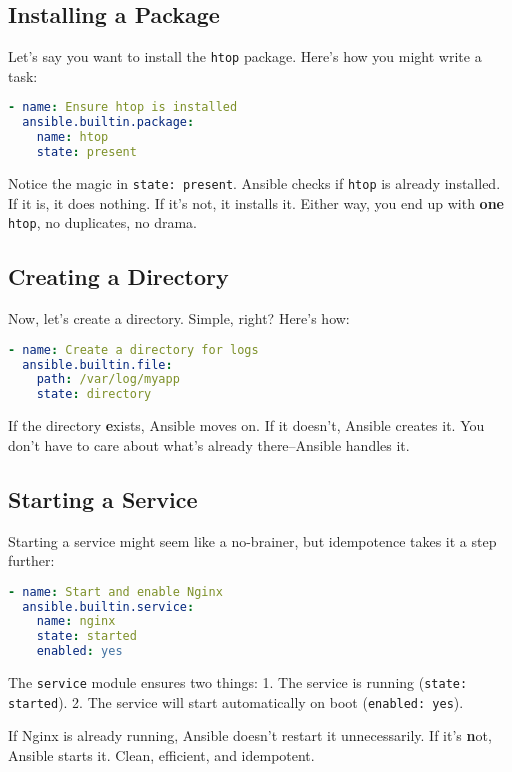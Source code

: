 \subsection{Installing a Package}

Let's say you want to install the \texttt{htop} package. Here's how you might write a task:
\begin{lstlisting}[language=yaml, caption=Installing a Package]
- name: Ensure htop is installed
  ansible.builtin.package:
    name: htop
    state: present
\end{lstlisting}

Notice the magic in \texttt{state: present}. Ansible checks if \texttt{htop} is already installed. If it is, it does nothing. If it's not, it installs it. Either way, you end up with \textbf{one} \texttt{htop}, no duplicates, no drama.

\subsection{Creating a Directory}

Now, let's create a directory. Simple, right? Here's how:
\begin{lstlisting}[language=yaml, caption=Creating a Directory]
- name: Create a directory for logs
  ansible.builtin.file:
    path: /var/log/myapp
    state: directory
\end{lstlisting}

If the directory \textbf{e}xists, Ansible moves on. If it doesn't, Ansible creates it. You don't have to care about what's already there--Ansible handles it.

\subsection{Starting a Service}

Starting a service might seem like a no-brainer, but idempotence takes it a step further:
\begin{lstlisting}[language=yaml, caption=Starting a Service]
- name: Start and enable Nginx
  ansible.builtin.service:
    name: nginx
    state: started
    enabled: yes
\end{lstlisting}

The \texttt{service} module ensures two things:
1. The service is running (\texttt{state: started}).
2. The service will start automatically on boot (\texttt{enabled: yes}).

If Nginx is already running, Ansible doesn't restart it unnecessarily. If it's \textbf{n}ot, Ansible starts it. Clean, efficient, and idempotent.


